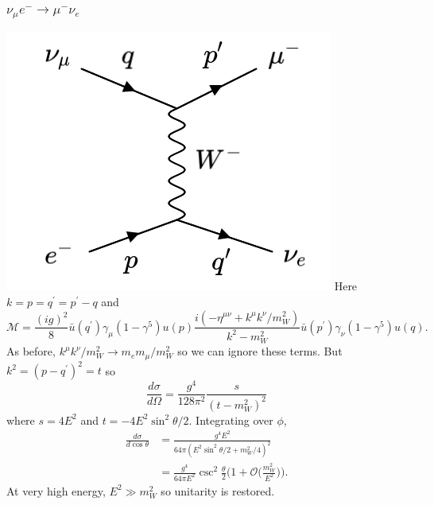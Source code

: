 \subsubsection{$\nu_\mu e^- \to \mu^- \nu_e$}
%
  \includegraphics[width=0.3\linewidth]{figs/17c.png}
Here $k = p=q^\prime = p^\prime - q$ and
\begin{equation}
\mathcal{M} = \frac{(ig)^2}{8}\bar{u}(q^\prime)\gamma_\mu(1-\gamma^5)u(p)\frac{i(-\eta^{\mu\nu} + k^\mu k^\nu/m_W^2)}{k^2-m_W^2}\bar{u}(p^\prime)\gamma_\nu (1-\gamma^5)u(q).
\end{equation}
As before, $k^\mu k^\nu /m_W^2 \to m_e m_\mu /m_W^2$ so we can ignore these terms. But $k^2 = (p-q^\prime)^2 = t$ so
\begin{equation}
\frac{d\sigma}{d\Omega} = \frac{g^4}{128\pi^2}\frac{s}{(t-m_W^2)^2}
\end{equation}
where $s=4E^2$ and $t=-4E^2\sin^2\theta/2$. Integrating over $\phi$,
\begin{equation}
\begin{split}
\frac{d\sigma}{d\cos\theta} &= \frac{g^4E^2}{64\pi(E^2\sin^2\theta/2 + m_W^2/4)^2}
\\
&= \frac{g^4}{64\pi E^2}\csc^2 \frac{\theta}{2}\bigg( 1 + \mathcal{O}\big(\frac{m_W^2}{E^2}\big)\bigg).
\end{split}
\end{equation}
At very high energy, $E^2 \gg m_W^2$ so unitarity is restored. 
%
